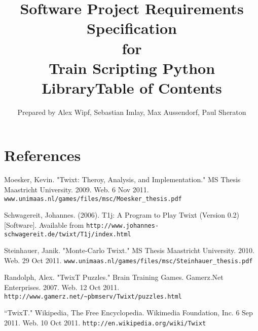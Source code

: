 \documentclass[a4paper,11pt,notitlepage]{article}
\title{{\bf Software Project Requirements Specification} \\ for \\ {\bf Train Scripting Python Library}}
\author{Prepared by Alex Wipf, Sebastian Imlay, Max Aussendorf, Paul Sheraton}
\begin{document}
\maketitle
\pagebreak
\title{Table of Contents}

\addtocounter{page}{-1}
\clearpage

\newpage
\section*{References}
\begin{hangparas}{.25in}{1}
Moesker, Kevin. "Twixt: Theroy, Analysis, and Implementation." MS Thesis Maastricht University. 2009. Web. 6 Nov 2011. \verb=www.unimaas.nl/games/files/msc/Moesker_thesis.pdf=

\vspace{5mm}
Schwagereit, Johannes. (2006). T1j: A Program to Play Twixt (Version 0.2) [Software]. Available from \verb=http://www.johannes-schwagereit.de/twixt/T1j/index.html=

\vspace{5mm}
Steinhauer, Janik. "Monte-Carlo Twixt." MS Thesis Maastricht University. 2010. Web. 29 Oct 2011. \verb=www.unimaas.nl/games/files/msc/Steinhauer_thesis.pdf=

\vspace{5mm}
Randolph, Alex. "TwixT Puzzles." Brain Training Games. Gamerz.Net Enterprises. 2007. Web. 12 Oct 2011. \verb=http://www.gamerz.net/~pbmserv/Twixt/puzzles.html=

\vspace{5mm}
``TwixT." Wikipedia, The Free Encyclopedia. Wikimedia Foundation, Inc. 6 Sep 2011. Web. 10 Oct 2011. \verb=http://en.wikipedia.org/wiki/Twixt=

\end{hangparas}
\end{document}
